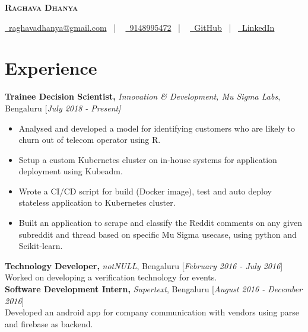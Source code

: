 \documentclass[10pt]{article}
\renewcommand{\textbf}[1]{{\bfseries\sffamily\color{accent_darkest}#1}}
\begin{document}
\thispagestyle{empty}

\begin{center}
 \textbf{\textsc{\color{anotherred}\Huge Raghava Dhanya}}\\[10pt] %
\end{center}

\begin{center}
 \href{mailto:raghavadhanya@gmail.com}{\faEnvelope\ raghavadhanya@gmail.com}
 \ | \ %
 \href{tel:9148995472}{\faPhoneSquare\ 9148995472} \ | \ %
 \href{https://github.com/RaghavaDhanya}{ \underline{\faGithubSquare\
 GitHub}} \ | \ \href{https://in.linkedin.com/in/raghavadhanya}{\underline
 {\faLinkedinSquare\ LinkedIn}} 
\end{center}


\section*{Experience} 
\textbf{Trainee Decision Scientist,} \textit{Innovation \& Development, Mu Sigma Labs},
 Bengaluru \hfill \textcolor{grey_darker}{[\textit{July 2018 - Present]}}
\begin{itemize}
    \itemsep0em

\item 
Analysed and developed a model for identifying customers who are likely to churn out of telecom operator
using R.
\item 
Setup a custom Kubernetes cluster on in-house systems for application deployment using Kubeadm.
\item 
Wrote a CI/CD script for build (Docker image), test and auto deploy stateless application to Kubernetes
cluster.
\item 
Built an application to scrape and classify the Reddit comments on any given subreddit and thread based
on specific Mu Sigma usecase, using python and Scikit-learn.
\end{itemize}
\textbf{Technology Developer,} \textit{notNULL},
Bengaluru \hfill \textcolor{grey_darker}{[\textit{February 2016 - July 2016}]}\\
Worked on developing a verification technology for events.
\medskip
\\
\textbf{Software Development Intern,} \textit{Supertext}, Bengaluru
\hfill \textcolor{grey_darker}{[\textit{August 2016 - December 2016}]}\\
Developed an android app for company communication with vendors using
parse and firebase as backend. 
\end{document}

